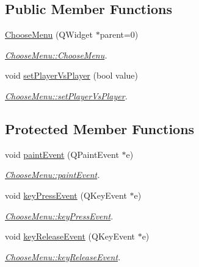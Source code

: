 \subsection*{Public Member Functions}
\begin{DoxyCompactItemize}
\item 
\hyperlink{class_choose_menu_ad44e7c05565bcea6c75ba6ddde2f0c51}{Choose\+Menu} (Q\+Widget $\ast$parent=0)
\begin{DoxyCompactList}\small\item\em \hyperlink{class_choose_menu_ad44e7c05565bcea6c75ba6ddde2f0c51}{Choose\+Menu\+::\+Choose\+Menu}. \end{DoxyCompactList}\item 
void \hyperlink{class_choose_menu_aa87f53c54f73ff60e7b4b3e77b2fa4b2}{set\+Player\+Vs\+Player} (bool value)
\begin{DoxyCompactList}\small\item\em \hyperlink{class_choose_menu_aa87f53c54f73ff60e7b4b3e77b2fa4b2}{Choose\+Menu\+::set\+Player\+Vs\+Player}. \end{DoxyCompactList}\end{DoxyCompactItemize}
\subsection*{Protected Member Functions}
\begin{DoxyCompactItemize}
\item 
void \hyperlink{class_choose_menu_a98996879611931da4a621b752ecdf4d1}{paint\+Event} (Q\+Paint\+Event $\ast$e)
\begin{DoxyCompactList}\small\item\em \hyperlink{class_choose_menu_a98996879611931da4a621b752ecdf4d1}{Choose\+Menu\+::paint\+Event}. \end{DoxyCompactList}\item 
void \hyperlink{class_choose_menu_ae3fec13ab674dc4a7b012efcc2b9c4f6}{key\+Press\+Event} (Q\+Key\+Event $\ast$e)
\begin{DoxyCompactList}\small\item\em \hyperlink{class_choose_menu_ae3fec13ab674dc4a7b012efcc2b9c4f6}{Choose\+Menu\+::key\+Press\+Event}. \end{DoxyCompactList}\item 
void \hyperlink{class_choose_menu_a89be0220a1eeb013ddc50ba27d4fa808}{key\+Release\+Event} (Q\+Key\+Event $\ast$e)
\begin{DoxyCompactList}\small\item\em \hyperlink{class_choose_menu_a89be0220a1eeb013ddc50ba27d4fa808}{Choose\+Menu\+::key\+Release\+Event}. \end{DoxyCompactList}\end{DoxyCompactItemize}


